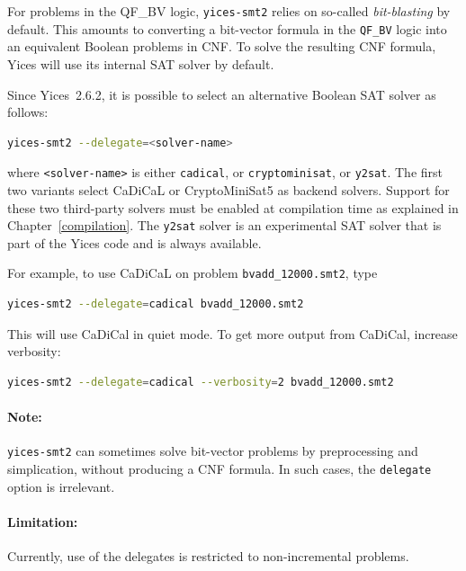 \documentclass[11pt,twoside,fleqn,openright,titlepage]{cslreport}
\begin{document}
For problems in the QF\_BV logic, \texttt{yices-smt2} relies on
so-called \emph{bit-blasting} by default. This amounts to
converting a bit-vector formula in the \texttt{QF\_BV} logic into an
equivalent Boolean problems in CNF. To solve the resulting CNF
formula, Yices will use its internal SAT solver by default.

\medskip\noindent
Since
Yices~2.6.2, it is possible to select an alternative Boolean SAT solver as follows:
\begin{small}
\begin{lstlisting}[language=sh]
   yices-smt2 --delegate=<solver-name>
\end{lstlisting}
\end{small}
where \texttt{<solver-name>} is either \texttt{cadical}, or
\texttt{cryptominisat}, or \texttt{y2sat}.  The first two variants
select CaDiCaL or CryptoMiniSat5 as backend solvers. Support for these
two third-party solvers must be enabled at compilation time as
explained in Chapter~\ref{compilation}. The \texttt{y2sat} solver is
an experimental SAT solver that is part of the Yices code and is
always available.

\medskip\noindent
For example, to use CaDiCaL on problem \texttt{bvadd\_12000.smt2}, type
\begin{small}
\begin{lstlisting}[language=sh]
   yices-smt2 --delegate=cadical bvadd_12000.smt2
\end{lstlisting}
\end{small}
This will use CaDiCal in quiet mode. To get more output from CaDiCal, increase verbosity:
\begin{small}
\begin{lstlisting}[language=sh]
   yices-smt2 --delegate=cadical --verbosity=2 bvadd_12000.smt2
\end{lstlisting}
\end{small}

\paragraph{Note:} \texttt{yices-smt2} can sometimes solve bit-vector
problems by preprocessing and simplication, without producing a CNF
formula. In such cases, the \texttt{delegate} option is irrelevant.

\paragraph{Limitation:} Currently, use of the delegates is restricted to non-incremental problems.
\end{document}
